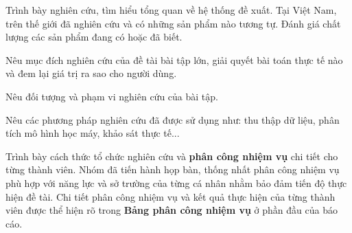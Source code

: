 
Trình bày nghiên cứu, tìm hiểu tổng quan về hệ thống đề xuất. Tại Việt Nam, trên thế giới đã nghiên cứu và có những sản phẩm nào tương tự. Đánh giá chất lượng các sản phẩm đang có hoặc đã biết.

Nêu mục đích nghiên cứu của đề tài bài tập lớn, giải quyết bài toán thực tế nào và đem lại giá trị ra sao cho người dùng.

Nêu đối tượng và phạm vi nghiên cứu của bài tập.

Nêu các phương pháp nghiên cứu đã được sử dụng như: thu thập dữ liệu, phân tích mô hình học máy, khảo sát thực tế...

Trình bày cách thức tổ chức nghiên cứu và \textbf{phân công nhiệm vụ} chi tiết cho từng thành viên. Nhóm đã tiến hành họp bàn, thống nhất phân công nhiệm vụ phù hợp với năng lực và sở trường của từng cá nhân nhằm bảo đảm tiến độ thực hiện đề tài. Chi tiết phân công nhiệm vụ và kết quả thực hiện của từng thành viên được thể hiện rõ trong \textbf{Bảng phân công nhiệm vụ} ở phần đầu của báo cáo.

